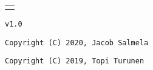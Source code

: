 \begin{center}
  \vspace*{1cm}
  \begin{tabular}{c}
    \textbf{}
  \end{tabular}
  \vfill
  \texttt{}
  \vfill
  \texttt{v1.0}

  \vspace{0.8cm}
  \texttt{Copyright (C) 2020, Jacob Salmela}

  \texttt{Copyright (C) 2019, Topi Turunen}
\end{center}
